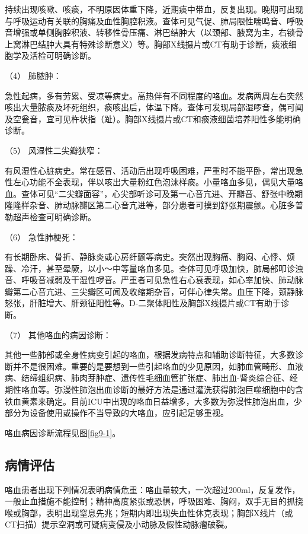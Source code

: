 持续出现咳嗽、咳痰，不明原因体重下降，近期痰中带血，反复出现。晚期可出现与呼吸运动有关联的胸痛及血性胸腔积液。查体可见气促、肺局限性喘鸣音、呼吸音增强或单侧胸腔积液、转移性骨压痛、淋巴结肿大（以颈部、腋窝为主，右锁骨上窝淋巴结肿大具有特殊诊断意义）等。胸部X线摄片或CT有助于诊断，痰液细胞学及活检可明确诊断。

\hypertarget{text00024.htmlux5cux23CHP1-9-2-5-4}{}
（4） 肺脓肿：

急性起病，多有劳累、受凉等病史。高热伴有不同程度的咯血。发病两周左右突然咳出大量脓痰及坏死组织，痰咳出后，体温下降。查体可发现局部湿啰音，偶可闻及空瓮音，宜可见杵状指（趾）。胸部X线摄片或CT和痰液细菌培养阳性多能明确诊断。

\hypertarget{text00024.htmlux5cux23CHP1-9-2-5-5}{}
（5） 风湿性二尖瓣狭窄：

有风湿性心脏病史。常在感冒、活动后出现呼吸困难，严重时不能平卧，常出现急性左心功能不全表现，伴以咳出大量粉红色泡沫样痰。小量咯血多见，偶见大量咯血。查体可见“二尖瓣面容”，心尖部听诊可及第一心音亢进、开瓣音、舒张中晚期隆隆样杂音、肺动脉瓣区第二心音亢进等，部分患者可摸到舒张期震颤。心脏多普勒超声检查可明确诊断。

\hypertarget{text00024.htmlux5cux23CHP1-9-2-5-6}{}
（6） 急性肺梗死：

有长期卧床、骨折、静脉炎或心房纤颤等病史。突然出现胸痛、胸闷、心悸、烦躁、冷汗，甚至晕厥，以小～中等量咯血多见。查体可见呼吸加快，肺局部叩诊浊音、呼吸音减弱及干湿性啰音。严重者可见急性右心衰表现，如心率加快、肺动脉瓣第二心音亢进、三尖瓣区可闻及收缩期杂音，可伴心律失常。血压下降，颈静脉怒张，肝脏增大、肝颈征阳性等。D-二聚体阳性及胸部X线摄片或CT有助于诊断。

\hypertarget{text00024.htmlux5cux23CHP1-9-2-5-7}{}
（7） 其他咯血的病因诊断：

其他一些肺部或全身性病变引起的咯血，根据发病特点和辅助诊断特征，大多数诊断并不是很困难。重要的是要想到一些引起咯血的少见原因，如肺血管畸形、血液病、结缔组织病、肺肉芽肿症、遗传性毛细血管扩张症、肺出血-肾炎综合征、经期性咯血等。弥漫性肺泡出血诊断的最好方法是通过灌洗获得肺泡巨噬细胞中的含铁血黄素来确定。目前ICU中出现的咯血日益增多，大多数为弥漫性肺泡出血，少部分为设备使用或操作不当导致的大咯血，应引起足够重视。

咯血病因诊断流程见图\ref{fig9-1}。

\subsection{病情评估}

咯血患者出现下列情况表明病情危重：咯血量较大，一次超过200ml，反复发作，一般止血措施不能控制；精神高度紧张或恐惧，呼吸困难、胸闷，双手无目的抓挠喉或胸部，表明出现窒息先兆；短期内即出现失血性休克表现；胸部X线片（或CT扫描）提示空洞或可疑病变侵及小动脉及假性动脉瘤破裂。

